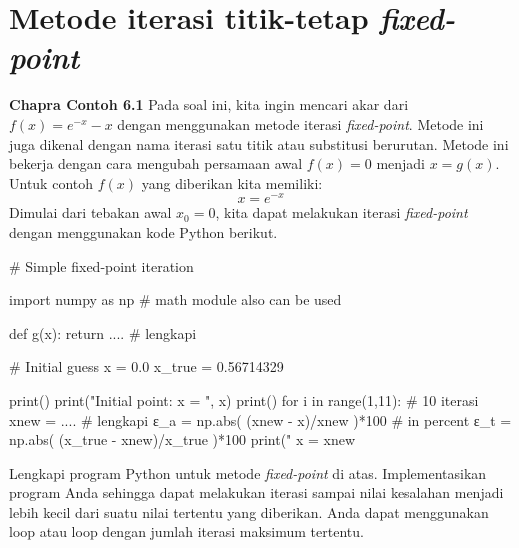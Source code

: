 \section{Metode iterasi titik-tetap \textit{fixed-point}}

\textbf{Chapra Contoh 6.1} Pada soal ini, kita ingin mencari akar dari $f(x) = e^{-x} - x$ dengan
menggunakan metode iterasi \textit{fixed-point}. Metode ini juga dikenal
dengan nama iterasi satu titik atau substitusi berurutan. Metode ini
bekerja dengan cara mengubah persamaan awal $f(x) = 0$ menjadi
$x = g(x)$. Untuk contoh $f(x)$ yang diberikan kita memiliki:
\begin{equation*}
x = e^{-x}
\end{equation*}
Dimulai dari tebakan awal $x_{0} = 0$, kita dapat melakukan iterasi
\textit{fixed-point} dengan menggunakan kode Python berikut.

\begin{pythoncode}
# Simple fixed-point iteration
    
import numpy as np # math module also can be used
    
def g(x):
    return .... # lengkapi
    
# Initial guess
x = 0.0
x_true = 0.56714329
    
print()
print("Initial point: x = ", x)
print()
for i in range(1,11): # 10 iterasi
    xnew = .... # lengkapi
    ε_a = np.abs( (xnew - x)/xnew )*100 # in percent
    ε_t = np.abs( (x_true - xnew)/x_true )*100
    print("%
    x = xnew    
\end{pythoncode}

\begin{soal}
Lengkapi program Python untuk metode \textit{fixed-point} di atas.
Implementasikan program Anda sehingga
dapat melakukan iterasi sampai nilai kesalahan menjadi lebih kecil dari
suatu nilai tertentu yang diberikan. Anda dapat menggunakan loop 
atau loop  dengan jumlah iterasi maksimum tertentu.
\end{soal}

